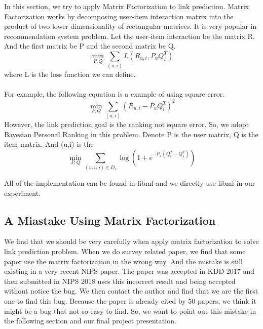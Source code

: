 \documentclass[12pt]{article}
\begin{document}
In this section, we try to apply Matrix Factorization to link prediction. Matrix Factorization works by decomposing user-item interaction matrix into the product of two lower dimensionality of rectangular matrices. It is very popular in recommendation system problem. Let the user-item interaction be the matrix R. And the first matrix be P and the second matrix be Q.  
\\
\begin{equation}
\min_{P,Q}{\sum_{(u,i)}{L(R_{u,i}, P_uQ_i^T)}}
\end{equation}
where L is the loss function we can define. \\
\\
For example, the following equation is a example of using square error. \\
\begin{equation}
\min_{P,Q}{\sum_{(u,i)}{(R_{u,i}-P_uQ_i^T)^2}}
\end{equation}
However, the link prediction goal is the ranking not square error. So, we adopt Bayesian Personal Ranking\cite{bpr} in this problem. Denote P is the user matrix, Q is the item matrix. And (u,i) is the 
\begin{equation}
\min_{P,Q} \sum_{(u,i,j)\in D_s}\log(1+e^{-P_u(Q_i^T - Q_j^T)})
\end{equation}

All of the implementation can be found in libmf\cite{libmf} and we directly use libmf in our experiment.

\subsection{A Miastake Using Matrix Factorization}
We find that we should be very carefully when apply matrix factorization to solve link prediction problem.
When we do survey related paper, we find that some paper use the matrix factorization in the wrong way. And the mistake is still existing in a very recent NIPS paper. The paper was accepted in KDD 2017 and then submitted in NIPS 2018 uses this incorrect result and being accepted without notice the bug. We then contact the author and  find that we are the first one to find this bug. Because the paper is already cited by 50 papers, we think it might be a bug that not so easy to find. So, we want to point out this mistake in the following section and our final project presentation.   
\end{document}
